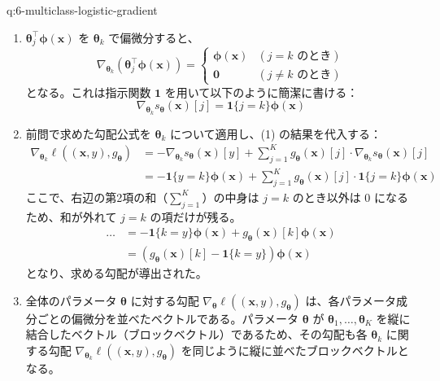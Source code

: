 \documentclass[
  pandoc]{bxjsarticle}
\begin{document}
\begin{answerbox}[phantomlabel=a:6-multiclass-logistic-gradient]{q:6-multiclass-logistic-gradient}

\begin{enumerate}
\def\labelenumi{\arabic{enumi}.}
\item
  \(\boldsymbol{\theta}_j^\top \boldsymbol{\phi}(\mathbf{x})\) を
  \(\boldsymbol{\theta}_k\) で偏微分すると、 \[
  \nabla_{\boldsymbol{\theta}_k} \left( \boldsymbol{\theta}_j^\top \boldsymbol{\phi}(\mathbf{x}) \right) = \begin{cases}
  \boldsymbol{\phi}(\mathbf{x}) & (j = k \text{ のとき}) \\
  \mathbf{0} & (j \neq k \text{ のとき})
  \end{cases}
  \] となる。これは指示関数 \(\mathbf{1}\)
  を用いて以下のように簡潔に書ける： \[
  \nabla_{\boldsymbol{\theta}_k} s_{\boldsymbol{\theta}}(\mathbf{x})[j] = \mathbf{1}\{j = k\} \boldsymbol{\phi}(\mathbf{x})
  \]
\item
  前問で求めた勾配公式を \(\boldsymbol{\theta}_k\) について適用し、(1)
  の結果を代入する： \begin{align*}
  \nabla_{\boldsymbol{\theta}_k} \ell((\mathbf{x}, y), g_{\boldsymbol{\theta}}) &= -\nabla_{\boldsymbol{\theta}_k} s_{\boldsymbol{\theta}}(\mathbf{x})[y] + \sum_{j=1}^K g_{\boldsymbol{\theta}}(\mathbf{x})[j] \cdot \nabla_{\boldsymbol{\theta}_k} s_{\boldsymbol{\theta}}(\mathbf{x})[j] \\
  &= -\mathbf{1}\{y = k\} \boldsymbol{\phi}(\mathbf{x}) + \sum_{j=1}^K g_{\boldsymbol{\theta}}(\mathbf{x})[j] \cdot \mathbf{1}\{j = k\} \boldsymbol{\phi}(\mathbf{x})
  \end{align*} ここで、右辺の第2項の和（\(\sum_{j=1}^K\)）の中身は
  \(j = k\) のとき以外は \(0\) になるため、和が外れて \(j=k\)
  の項だけが残る。 \begin{align*}
  \dots &= -\mathbf{1}\{k = y\} \boldsymbol{\phi}(\mathbf{x}) + g_{\boldsymbol{\theta}}(\mathbf{x})[k] \boldsymbol{\phi}(\mathbf{x}) \\
  &= \left( g_{\boldsymbol{\theta}}(\mathbf{x})[k] - \mathbf{1}\{k = y\} \right) \boldsymbol{\phi}(\mathbf{x})
  \end{align*} となり、求める勾配が導出された。
\item
  全体のパラメータ \(\boldsymbol{\theta}\) に対する勾配
  \(\nabla_{\boldsymbol{\theta}} \ell((\mathbf{x}, y), g_{\boldsymbol{\theta}})\)
  は、各パラメータ成分ごとの偏微分を並べたベクトルである。パラメータ
  \(\boldsymbol{\theta}\) が
  \(\boldsymbol{\theta}_1, \dots, \boldsymbol{\theta}_K\)
  を縦に結合したベクトル（ブロックベクトル）であるため、その勾配も各
  \(\boldsymbol{\theta}_k\) に関する勾配
  \(\nabla_{\boldsymbol{\theta}_k} \ell((\mathbf{x}, y), g_{\boldsymbol{\theta}})\)
  を同じように縦に並べたブロックベクトルとなる。


\end{enumerate}
\end{answerbox}
\end{document}
